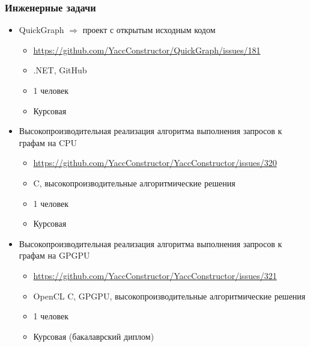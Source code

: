 \documentclass{beamer}
\begin{document}
\begin{frame}[fragile]
\transwipe[direction=90]
\frametitle{Инженерные задачи}
  \begin{itemize}
    \item QuickGraph $\Rightarrow$ проект с открытым исходным кодом
    \begin{itemize}
       \item \footnotesize{\url{https://github.com/YaccConstructor/QuickGraph/issues/181}}
       \item .NET, GitHub
       \item 1 человек 
       \item Курсовая
    \end{itemize}
    \item Высокопроизводительная реализация алгоритма выполнения запросов к графам на CPU
    \begin{itemize}
       \item \footnotesize{\url{https://github.com/YaccConstructor/YaccConstructor/issues/320}}
       \item C, высокопроизводительные алгоритмические решения
       \item 1 человек
       \item Курсовая
    \end{itemize}
    \item Высокопроизводительная реализация алгоритма выполнения запросов к графам на GPGPU
    \begin{itemize}
       \item \footnotesize{\url{https://github.com/YaccConstructor/YaccConstructor/issues/321}}
       \item OpenCL C, GPGPU, высокопроизводительные алгоритмические решения
       \item 1 человек
       \item Курсовая (бакалаврский диплом)
    \end{itemize}
  \end{itemize}  
\end{frame}
\end{document}
